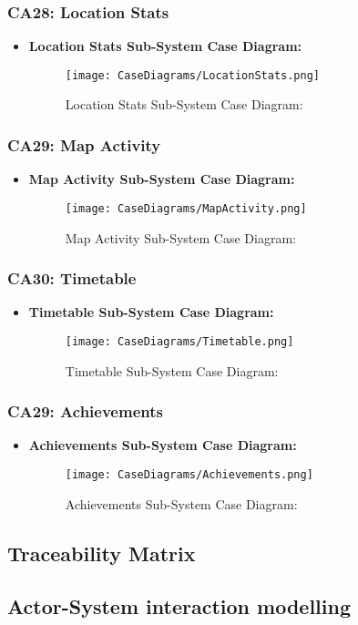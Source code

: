 \documentclass[12pt,a4paper]{article}
\begin{document}
		\subsubsection{CA28: Location Stats}
			\begin{itemize}
				\item \textbf{Location Stats Sub-System Case Diagram:}
				\begin{figure}[H]
					\texttt{[image: CaseDiagrams/LocationStats.png]}
					\caption{Location Stats Sub-System Case Diagram:}
				\end{figure}
			\end{itemize}
		\subsubsection{CA29: Map Activity}
			\begin{itemize}
				\item \textbf{Map Activity Sub-System Case Diagram:}
				\begin{figure}[H]
					\texttt{[image: CaseDiagrams/MapActivity.png]}
					\caption{Map Activity Sub-System Case Diagram:}
				\end{figure}
			\end{itemize}
		\subsubsection{CA30: Timetable}
			\begin{itemize}
				\item \textbf{Timetable Sub-System Case Diagram:}
				\begin{figure}[H]
					\texttt{[image: CaseDiagrams/Timetable.png]}
					\caption{Timetable Sub-System Case Diagram:}
				\end{figure}
			\end{itemize}
		\subsubsection{CA29: Achievements}
			\begin{itemize}
				\item \textbf{Achievements Sub-System Case Diagram:}
				\begin{figure}[H]
					\texttt{[image: CaseDiagrams/Achievements.png]}
					\caption{Achievements Sub-System Case Diagram:}
				\end{figure}
			\end{itemize}
	\subsection{Traceability Matrix}
	\subsection{Actor-System interaction modelling}
\end{document}
